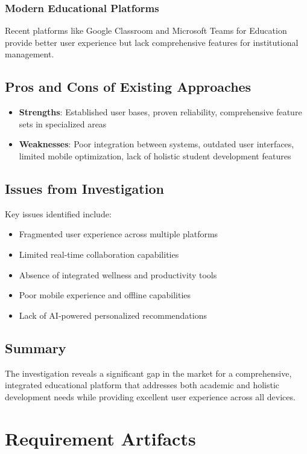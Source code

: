 \subsubsection{Modern Educational Platforms}
Recent platforms like Google Classroom and Microsoft Teams for Education provide better user experience but lack comprehensive features for institutional management.

\subsection{Pros and Cons of Existing Approaches}
\begin{itemize}
\item \textbf{Strengths}: Established user bases, proven reliability, comprehensive feature sets in specialized areas
\item \textbf{Weaknesses}: Poor integration between systems, outdated user interfaces, limited mobile optimization, lack of holistic student development features
\end{itemize}

\subsection{Issues from Investigation}
Key issues identified include:
\begin{itemize}
\item Fragmented user experience across multiple platforms
\item Limited real-time collaboration capabilities
\item Absence of integrated wellness and productivity tools
\item Poor mobile experience and offline capabilities
\item Lack of AI-powered personalized recommendations
\end{itemize}

\subsection{Summary}
The investigation reveals a significant gap in the market for a comprehensive, integrated educational platform that addresses both academic and holistic development needs while providing excellent user experience across all devices.

\newpage
\section{Requirement Artifacts}


